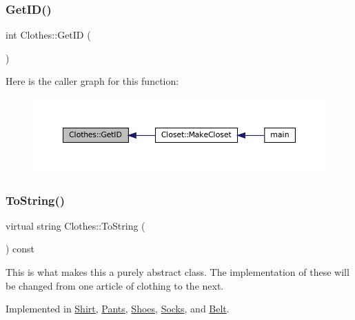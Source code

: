 \subsubsection{\texorpdfstring{Get\+I\+D()}{GetID()}}
{\footnotesize\ttfamily int Clothes\+::\+Get\+ID (\begin{DoxyParamCaption}{ }\end{DoxyParamCaption})\hspace{0.3cm}{\ttfamily [inline]}}

Here is the caller graph for this function\+:
\nopagebreak
\begin{figure}[H]
\begin{center}
\leavevmode
\includegraphics[width=350pt]{classClothes_a3f6dac172f333126d19010f85ec44e4c_icgraph}
\end{center}
\end{figure}
\mbox{\label{classClothes_a953d143394e9a2c007ab0c3a638973cf}} 
\subsubsection{\texorpdfstring{To\+String()}{ToString()}}
{\footnotesize\ttfamily virtual string Clothes\+::\+To\+String (\begin{DoxyParamCaption}{ }\end{DoxyParamCaption}) const\hspace{0.3cm}{\ttfamily [pure virtual]}}

This is what makes this a purely abstract class. The implementation of these will be changed from one article of clothing to the next. 

Implemented in \mbox{\hyperlink{classShirt_ab85aaa20a603d63f4144d1b42d9b616d}{Shirt}}, \mbox{\hyperlink{classPants_a9b5fcde766a77877bf428e18c65f1e70}{Pants}}, \mbox{\hyperlink{classShoes_a9b1bcc00ec7ef920d34bf9193c96a1ce}{Shoes}}, \mbox{\hyperlink{classSocks_aad237fbcc4ccf36a2956fcdef8760683}{Socks}}, and \mbox{\hyperlink{classBelt_af09e2b5e51b7603ec5dede2e6b0a753f}{Belt}}.



